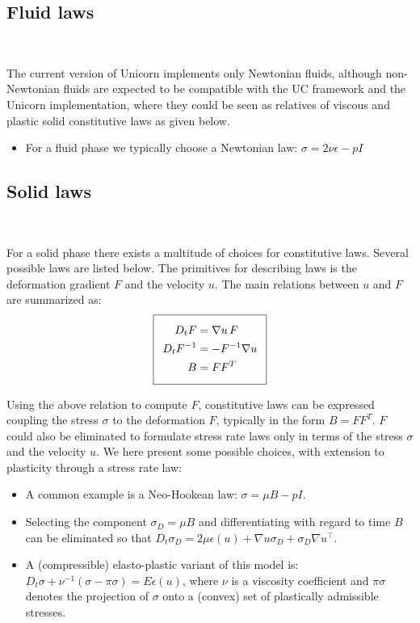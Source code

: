 \subsection{Fluid laws}

\

The current version of Unicorn implements only Newtonian fluids,
although non-Newtonian fluids are expected to be compatible with the
UC framework and the Unicorn implementation, where they could be seen
as relatives of viscous and plastic solid constitutive laws as given
below.

\begin{itemize}
\item
For a fluid phase we typically choose a Newtonian law: $\sigma = 2 \nu \epsilon - pI$
\end{itemize}

\subsection{Solid laws}

\

For a solid phase there exists a multitude of choices for constitutive
laws. Several possible laws are listed below. The primitives for
describing laws is the deformation gradient $F$ and the velocity
$u$. The main relations between $u$ and $F$ are summarized as:
\begin{equation}
  \addtolength{\fboxsep}{5pt}
  \boxed{
    \begin{split}\label{eq:DeformationRate1}
      D_t F &= \nabla u \, F\\
      D_t F^{-1} &= -F^{-1} \nabla u\\
      B &= FF^T
    \end{split}
  }
\end{equation}

Using the above relation to compute $F$, constitutive laws can be
expressed coupling the stress $\sigma$ to the deformation $F$,
typically in the form $B = FF^T$. $F$ could also be eliminated to
formulate stress rate laws only in terms of the stress $\sigma$ and
the velocity $u$. We here present some possible choices, with
extension to plasticity through a stress rate law:

\begin{itemize}
\item
A common example is a Neo-Hookean law: $\sigma = \mu B - pI$.
\item
Selecting the component $\sigma_D = \mu B$ and differentiating with
regard to time $B$ can be eliminated so that $D_t
\sigma_D = 2 \mu \epsilon(u) + \nabla u \sigma_D  + \sigma_D \nabla u^{\top}$.
\item
A (compressible) elasto-plastic variant of this model
is: $D_t \sigma + \nu^{-1} (\sigma - \pi \sigma) = E \epsilon(u)$,
where $\nu$ is a viscosity coefficient and $\pi \sigma$ denotes the
projection of $\sigma$ onto a (convex) set of plastically admissible
stresses.
\end{itemize}


